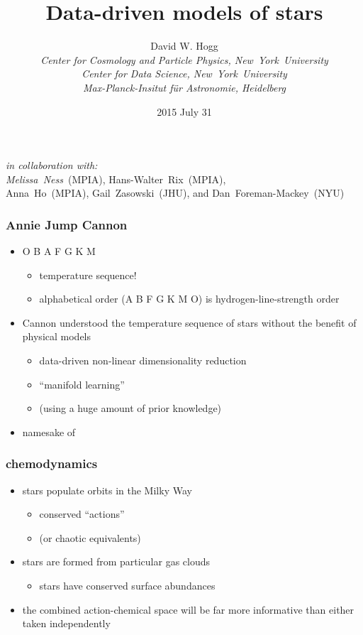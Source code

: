 \documentclass[pdftex]{beamer}
\title{Data-driven models of stars}
\author[David W. Hogg (NYU)]{David W. Hogg \\
  \textsl{\footnotesize Center for Cosmology and Particle Physics,
                 New~York~University} \\
  \textsl{\footnotesize Center for Data Science,
                 New~York~University} \\
  \textsl{\footnotesize Max-Planck-Insitut f\"ur Astronomie, Heidelberg}}
\date{2015 July 31}
\newcommand{\teff}{T_{\mathrm{eff}}}
\newcommand{\logg}{\log g}
\newcommand{\feh}{[\mathrm{Fe / H}]}
\newcommand{\conclusions}{%
\begin{frame}
  \frametitle{conclusions}
  \begin{itemize}
  \item A data-driven label transfer system provides \apogee\ stars with labels comparable in quality to the \apogee\ physics-driven pipeline.
    \begin{itemize}
    \item \tc\ (Ness \etal, \textit{ApJ} submitted)
    \item ``labels'' $\equiv (\teff,\logg,\feh)$
    \end{itemize}
  \item \tc\ uses \emph{no physical model of stars}.
  \item The method and the training set are both immature zeroth steps.
  \item There is hope for a consistent system of stellar parameters and chemical abundances across all future surveys.
    \begin{itemize}
    \item \gaia\ \& \project{Gaia-ESO}
    \item \sdssiii\ \project{SEGUE} \& \apogee; \sdssiv\ \project{APOGEE-2}
    \item \project{HERMES} / \project{GALAH}
    \end{itemize}
  \item \texttt{\giturl}
  \end{itemize}
\end{frame}}
\begin{document}
\begin{frame}
  \titlepage
  {\footnotesize \textit{in collaboration with:}\\
  \emph{Melissa~Ness}~(MPIA), Hans-Walter~Rix~(MPIA), \\
  Anna~Ho~(MPIA), Gail~Zasowski~(JHU), and Dan~Foreman-Mackey~(NYU)}
\end{frame}


\begin{frame}
  \frametitle{Annie Jump Cannon}
  \begin{itemize}
  \item O B A F G K M
    \begin{itemize}
    \item temperature sequence!
    \item alphabetical order (A B F G K M O) is hydrogen-line-strength order
    \end{itemize}
  \item Cannon understood the temperature sequence of stars without the benefit of physical models
    \begin{itemize}
    \item data-driven non-linear dimensionality reduction
    \item ``manifold learning''
    \item (using a huge amount of prior knowledge)
    \end{itemize}
  \item namesake of \tc
  \end{itemize}
\end{frame}

\begin{frame}
  \frametitle{chemodynamics}
  \begin{itemize}
  \item stars populate orbits in the Milky Way
    \begin{itemize}
    \item conserved ``actions''
    \item (or chaotic equivalents)
    \end{itemize}
  \item stars are formed from particular gas clouds
    \begin{itemize}
    \item stars have conserved surface abundances
    \end{itemize}
  \item the combined action-chemical space will be far more
    informative than either taken independently
  \end{itemize}
\end{frame}
\end{document}
